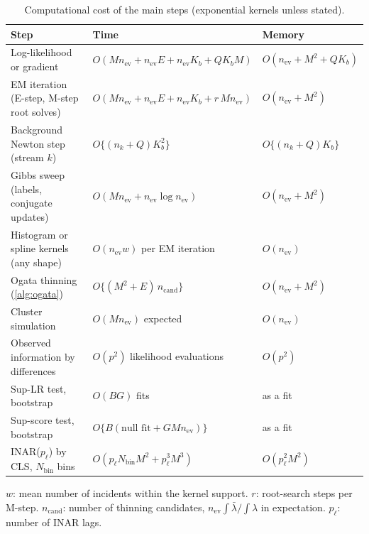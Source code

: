 \begin{table}[t]
\centering
\caption{Computational cost of the main steps (exponential kernels unless stated).}\label{tab:app-cost}
\small
\begin{tabularx}{\textwidth}{@{}Xll@{}}
\toprule
Step & Time & Memory\\
\midrule
Log-likelihood or gradient & $O(Mn_{\mathrm{ev}}+{n_{\mathrm{ev}}}E+n_{\mathrm{ev}}K_b+QK_bM)$ & $O(n_{\mathrm{ev}}+M^2+QK_b)$\\
EM iteration (E-step, M-step root solves) & $O(Mn_{\mathrm{ev}}+{n_{\mathrm{ev}}}E+n_{\mathrm{ev}}K_b+r\,Mn_{\mathrm{ev}})$ & $O(n_{\mathrm{ev}}+M^2)$\\
Background Newton step (stream $k$) & $O\{(n_k+Q)K_b^2\}$ & $O\{(n_k+Q)K_b\}$\\
Gibbs sweep (labels, conjugate updates) & $O(Mn_{\mathrm{ev}}+n_{\mathrm{ev}}\log n_{\mathrm{ev}})$ & $O(n_{\mathrm{ev}}+M^2)$\\
Histogram or spline kernels (any shape) & $O(n_{\mathrm{ev}}w)$ per EM iteration & $O(n_{\mathrm{ev}})$\\
Ogata thinning (\cref{alg:ogata}) & $O\{(M^2+E)\,n_{\mathrm{cand}}\}$ & $O(n_{\mathrm{ev}}+M^2)$\\
Cluster simulation & $O(Mn_{\mathrm{ev}})$ expected & $O(n_{\mathrm{ev}})$\\
Observed information by differences & $O(p^2)$ likelihood evaluations & $O(p^2)$\\
Sup-LR test, bootstrap & $O(BG)$ fits & as a fit\\
Sup-score test, bootstrap & $O\{B(\text{null fit}+GMn_{\mathrm{ev}})\}$ & as a fit\\
INAR($p_{\ell}$) by CLS, $N_{\mathrm{bin}}$ bins & $O(p_\ell N_{\mathrm{bin}}M^2+p_\ell^3M^3)$ & $O(p_\ell^2M^2)$\\
\bottomrule
\end{tabularx}
\par\smallskip
\begin{minipage}{\textwidth}\footnotesize
$w$: mean number of incidents within the kernel support. $r$: root-search steps per
M-step. $n_{\mathrm{cand}}$: number of
thinning candidates, $n_{\mathrm{ev}}\int\bar\lambda/\int\lambda$ in expectation. $p_\ell$: number of
INAR lags.
\end{minipage}
\end{table}

\FloatBarrier
